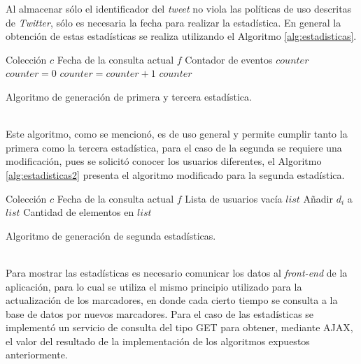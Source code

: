 Al almacenar sólo el identificador del \textit{tweet} no viola las políticas de uso descritas de \textit{Twitter}, sólo es necesaria la fecha para realizar la estadística. En general la obtención de estas estadísticas se realiza utilizando el Algoritmo \ref{alg:estadisticas}.\\

\begin{algorithm}[H]
	\begin{algorithmic}
		\REQUIRE Colección $c$ 
		\REQUIRE Fecha de la consulta actual $f$ 
		\ENSURE Contador de eventos $counter$  
		\STATE $counter = 0$
				\STATE $counter = counter + 1$
			\ENDIF	
		\ENDFOR
		\RETURN $counter$
	\end{algorithmic}
	\caption{Algoritmo de generación de primera y tercera estadística.}
	\label{alg:estadisticas}
\end{algorithm}\vphantom\\

Este algoritmo, como se mencionó, es de uso general y permite cumplir tanto la primera como la tercera estadística, para el caso de la segunda se requiere una modificación, pues se solicitó conocer los usuarios diferentes, el Algoritmo \ref{alg:estadisticas2} presenta el algoritmo modificado para la segunda estadística.\\

\begin{algorithm}[H]
	\begin{algorithmic}
		\REQUIRE Colección $c$ 
		\REQUIRE Fecha de la consulta actual $f$ 
		\ENSURE Lista de usuarios vacía $list$  
					\STATE Añadir $d_{i}$ a $list$
				\ENDIF
			\ENDIF	
		\ENDFOR
		\RETURN Cantidad de elementos en $list$
	\end{algorithmic}
	\caption{Algoritmo de generación de segunda estadísticas.}
	\label{alg:estadisticas2}
\end{algorithm}\vphantom\\

Para mostrar las estadísticas es necesario comunicar los datos al \textit{front-end} de la aplicación, para lo cual se utiliza el mismo principio utilizado para la actualización de los marcadores, en donde cada cierto tiempo se consulta a la base de datos por nuevos marcadores. Para el caso de las estadísticas se implementó un servicio de consulta del tipo GET para obtener, mediante AJAX, el valor del resultado de la implementación de los algoritmos expuestos anteriormente.

